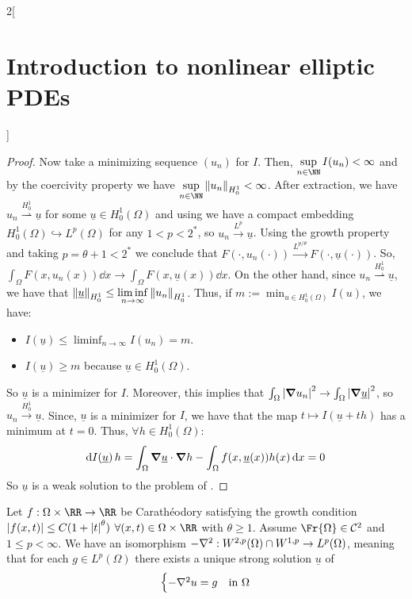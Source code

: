 \documentclass[../../../main_math.tex]{subfiles}
\begin{document}
\begin{multicols}{2}[\section{Introduction to nonlinear elliptic PDEs}]
\begin{proof}
    Now take a minimizing sequence $(u_n)$ for $I$. Then, $\displaystyle \sup_{n\in\NN}I(u_n)<\infty$ and by the coercivity property we have $\displaystyle \sup_{n\in\NN}\norm{u_n}_{H_0^1}<\infty$. After extraction, we have $u_n\overset{H_0^1}{\rightharpoonup} \underline{u}$ for some $\underline{u}\in H_0^1(\Omega)$ and using  we have a compact embedding $H_0^1(\Omega)\hookrightarrow L^p(\Omega)$ for any $1< p< 2^*$, so $u_n\overset{L^p}{\to} \underline{u}$. Using the growth property and taking $p=\theta+1<2^*$ we conclude that $F(\cdot,u_n(\cdot))\overset{L^{p/\theta}}{\to} F(\cdot,\underline{u}(\cdot))$. So, $\int_\Omega F(x,u_n(x))\dd{x}\to \int_\Omega F(x,\underline{u}(x))\dd{x}$. On the other hand, since $u_n\overset{H_0^1}{\rightharpoonup} \underline{u}$, we have that $\displaystyle \norm{\underline{u}}_{H_0^1}\leq \liminf_{n\to\infty}\norm{u_n}_{H_0^1}$. Thus, if $\displaystyle m:=\min_{u\in H_0^1(\Omega)}I(u)$, we have:
    \begin{itemize}
      \item $\displaystyle I(\underline{u})\leq \liminf_{n\to\infty}I(u_n)=m$.
      \item $I(\underline{u})\geq m$ because $\underline{u}\in H_0^1(\Omega)$.
    \end{itemize}
    So $\underline{u}$ is a minimizer for $I$. Moreover, this implies that $\int_\Omega \abs{\grad u_n}^2\to \int_\Omega \abs{\grad \underline{u}}^2$, so $u_n\overset{H_0^1}{\to} \underline{u}$. Since, $\underline{u}$ is a minimizer for $I$, we have that the map $t\mapsto I(\underline{u}+th)$ has a minimum at $t=0$. Thus, $\forall h\in H_0^1(\Omega)$:
    $$
      \dd{I(\underline{u})}h=\int_\Omega \grad \underline{u}\cdot \grad h-\int_\Omega f(x,\underline{u}(x))h(x)\dd{x}=0
    $$
    So $\underline{u}$ is a weak solution to the problem of .
  \end{proof}
  \begin{theorem}[Bootstrap]
    Let $f:\Omega\times \RR\to\RR$ be Carathéodory satisfying the growth condition $\abs{f(x,t)}\leq C(1+\abs{t}^\theta)$ $\forall (x,t)\in \Omega\times \RR$ with $\theta\geq 1$. Assume $\Fr{\Omega}\in \mathcal{C}^2$ and $1\leq p<\infty$. We have an isomorphism $-\laplacian:W^{2,p}(\Omega)\cap W^{1,p}\to L^p(\Omega)$, meaning that for each $g\in L^p(\Omega)$ there exists a unique strong solution $\underline{u}$ of
    $$
      \begin{cases}
        -\laplacian u=g    & \text{in }\Omega      \\

\end{cases}$$
\end{theorem}
\end{multicols}
\end{document}
